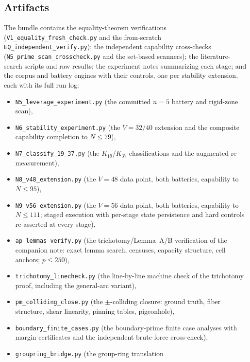 \subsection{Artifacts}

\begingroup\sloppy
The bundle \cite{prog-artifacts} contains the equality-theorem
verifications (\texttt{V1\_equality\_fresh\_check.py} and the
from-scratch \texttt{EQ\_independent\_verify.py}); the independent
capability cross-checks (\texttt{N5\_prime\_scan\_crosscheck.py} and the
set-based scanners); the literature-search scripts and raw results; the
experiment notes summarizing each stage; and the corpus and battery
engines with their controls, one per stability extension, each with its
full run log:
\begin{itemize}[leftmargin=2.2em,itemsep=1pt,topsep=2pt]
  \item \texttt{N5\_leverage\_experiment.py} (the committed $n=5$
        battery and rigid-zone scan),
  \item \texttt{N6\_stability\_experiment.py} (the $V=32/40$ extension
        and the composite capability completion to $N\le79$),
  \item \texttt{N7\_classify\_19\_37.py} (the $K_{19}$/$K_{37}$
        classifications and the augmented re-measurement),
  \item \texttt{N8\_v48\_extension.py} (the $V=48$ data point, both
        batteries, capability to $N\le95$),
  \item \texttt{N9\_v56\_extension.py} (the $V=56$ data point, both
        batteries, capability to $N\le111$; staged execution with
        per-stage state persistence and hard controls re-asserted at
        every stage),
  \item \texttt{ap\_lemmas\_verify.py} (the trichotomy/Lemma~A/B
        verification of the companion note: exact lemma search,
        censuses, capacity structure, cell anchors; $p\le250$),
  \item \texttt{trichotomy\_linecheck.py} (the line-by-line machine
        check of the trichotomy proof, including the general-arc
        variant),
  \item \texttt{pm\_colliding\_close.py} (the $\pm$-colliding closure:
        ground truth, fiber structure, shear linearity, pinning tables,
        pigeonhole),
  \item \texttt{boundary\_finite\_cases.py} (the boundary-prime finite
        case analyses with margin certificates and the independent
        brute-force cross-check),
  \item \texttt{groupring\_bridge.py} (the group-ring translation

\end{itemize}
